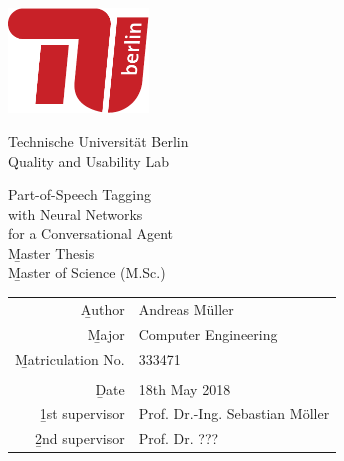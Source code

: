 
\pagestyle{empty}

\clearscrheadings\clearscrplain
\begin{center}
\includegraphics[width=0.28\textwidth]{images/logo_tu_berlin}
\vspace{8mm}

{\huge Technische Universität Berlin}\\
\vspace{2mm}
{\large Quality and Usability Lab}\\
\vspace{11mm}

{\Huge Part-of-Speech Tagging\\[-2mm] with Neural Networks\\[-2mm] for a Conversational Agent\\}
\vspace{20mm}
{\Huge \b{Master Thesis}}\\
{\b{Master of Science (M.Sc.)}}\\
\vspace{24mm}
\begin{tabular}{rl}
  \b{Author} & Andreas Müller\\
  \b{Major} & Computer Engineering\\
  \b{Matriculation No.} & 333471\\
   & \\
  \b{Date} & 18th May 2018 \\
  \b{1st supervisor} & Prof. Dr.-Ing. Sebastian Möller \\
  \b{2nd supervisor} & Prof. Dr. ??? \\
\end{tabular}

\end{center}
\clearpage
\pagestyle{useheadings} %

